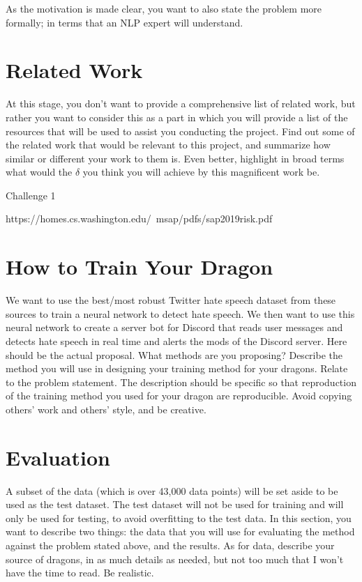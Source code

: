 \documentclass[conference]{sig-alternate-05-2015}
\begin{document}
As the motivation is made clear, you want to also state the problem more formally; in terms that an NLP expert will understand.
\color{black}

\section{Related Work}\label{sec:related}
\color{red}At this stage, you don't want to provide a comprehensive list of related work, but rather you want to consider this as a part in which you will provide a list of the resources that will be used to assist you conducting the project. Find out some of the related work that would be relevant to this project, and summarize how similar or different your work to them is. Even better, highlight in broad terms what would the $\delta$ you think you will achieve by this magnificent work be.
\color{green}


Challenge 1

https://homes.cs.washington.edu/~msap/pdfs/sap2019risk.pdf
\color{black}



\section{How to Train Your Dragon}\label{sec:design}
We want to use the best/most robust Twitter hate speech dataset from these sources \cite{Kaggle}\cite{HateSpeech} to train a neural network to detect hate speech. We then want to use this neural network to create a server bot for Discord that reads user messages and detects hate speech in real time and alerts the mods of the Discord server.
\color{red}Here should be the actual proposal. What methods are you proposing? Describe the method you will use in designing your training method for your dragons. Relate to the problem statement. The description should be specific so that reproduction of the training method you used for your dragon are reproducible. Avoid copying others' work and others' style, and be creative.
\color{black}

\section{Evaluation}\label{sec:evaluation}
A subset of the data (which is over 43,000 data points) will be set aside to be used as the test dataset. The test dataset will not be used for training and will only be used for testing, to avoid overfitting to the test data.
\color{red}In this section, you want to describe two things: the data that you will use for evaluating the method against the problem stated above, and the results. As for data, describe your source of dragons, in as much details as needed, but not too much that I won't have the time to read. Be realistic.
\end{document}
